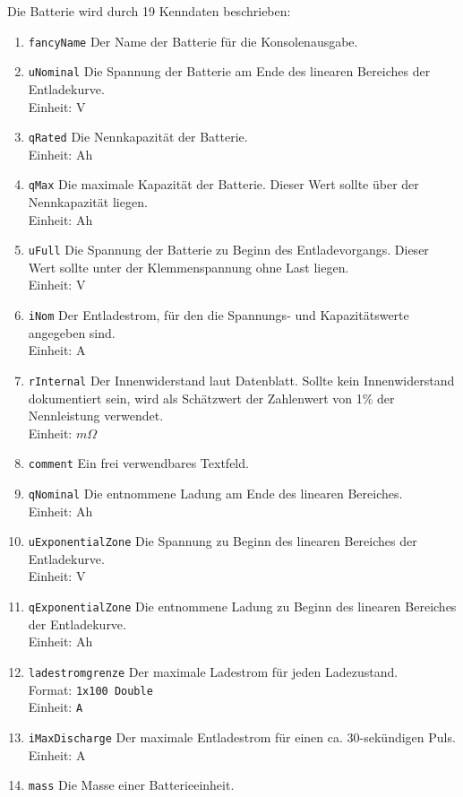 Die Batterie wird durch 19 Kenndaten beschrieben:
\begin{enumerate}
	\item \texttt{fancyName} Der Name der Batterie für die Konsolenausgabe.
	\item \texttt{uNominal} Die Spannung der Batterie am Ende des linearen Bereiches der Entladekurve.\\
	Einheit: V
	\item \texttt{qRated} Die Nennkapazität der Batterie.\\
	Einheit: Ah
	\item \texttt{qMax} Die maximale Kapazität der Batterie. Dieser Wert sollte über der Nennkapazität liegen.\\
	Einheit: Ah
	\item \texttt{uFull} Die Spannung der Batterie zu Beginn des Entladevorgangs. Dieser Wert sollte unter der Klemmenspannung ohne Last liegen.\\
	Einheit: V
	\item \texttt{iNom} Der Entladestrom, für den die Spannungs- und Kapazitätswerte angegeben sind.\\
	Einheit: A
	\item \texttt{rInternal} Der Innenwiderstand laut Datenblatt. Sollte kein Innenwiderstand dokumentiert sein, wird als Schätzwert der Zahlenwert von 1\% der Nennleistung verwendet.\\
	Einheit: $m\Omega$
	\item \texttt{comment} Ein frei verwendbares Textfeld.
	\item \texttt{qNominal} Die entnommene Ladung am Ende des linearen Bereiches.\\
	Einheit: Ah
	\item \texttt{uExponentialZone} Die Spannung zu Beginn des linearen Bereiches der Entladekurve.\\
	Einheit: V
	\item \texttt{qExponentialZone} Die entnommene Ladung zu Beginn des linearen Bereiches der Entladekurve.\\
	Einheit: Ah
	\item \texttt{ladestromgrenze} Der maximale Ladestrom für jeden Ladezustand.\\
	Format: \texttt{1x100 Double}\\
	Einheit: \texttt{A}
	\item \texttt{iMaxDischarge} Der maximale Entladestrom für einen ca. 30-sekündigen Puls.\\
	Einheit: A
	\item \texttt{mass} Die Masse einer Batterieeinheit.\\

\end{enumerate}
